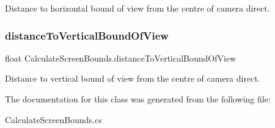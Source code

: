 Distance to horizontal bound of view from the centre of camera direct. 

\mbox{\label{class_calculate_screen_bounds_ae23c6986f2ecddbfd38c00c7bfc6855f}} 
\subsubsection{\texorpdfstring{distance\+To\+Vertical\+Bound\+Of\+View}{distanceToVerticalBoundOfView}}
{\footnotesize\ttfamily float Calculate\+Screen\+Bounds.\+distance\+To\+Vertical\+Bound\+Of\+View\hspace{0.3cm}{\ttfamily [static]}}



Distance to vertical bound of view from the centre of camera direct. 



The documentation for this class was generated from the following file\+:\begin{DoxyCompactItemize}
\item 
Calculate\+Screen\+Bounds.\+cs\end{DoxyCompactItemize}
